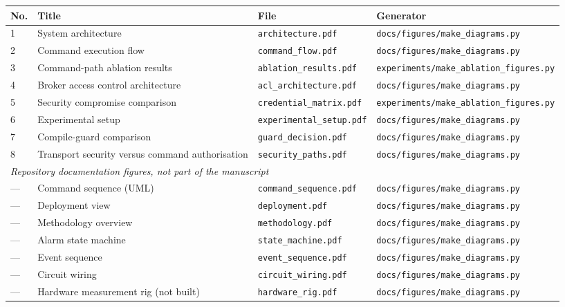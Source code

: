 \begin{longtable}{l p{} p{} p{}}
\toprule
\textbf{No.} & \textbf{Title} & \textbf{File} & \textbf{Generator} \\
\midrule
\endhead
1 & System architecture & \texttt{\footnotesize architecture.pdf} & \texttt{\footnotesize docs/figures/make\_diagrams.py} \\
2 & Command execution flow & \texttt{\footnotesize command\_flow.pdf} & \texttt{\footnotesize docs/figures/make\_diagrams.py} \\
3 & Command-path ablation results & \texttt{\footnotesize ablation\_results.pdf} & \texttt{\footnotesize experiments/make\_ablation\_figures.py} \\
4 & Broker access control architecture & \texttt{\footnotesize acl\_architecture.pdf} & \texttt{\footnotesize docs/figures/make\_diagrams.py} \\
5 & Security compromise comparison & \texttt{\footnotesize credential\_matrix.pdf} & \texttt{\footnotesize experiments/make\_ablation\_figures.py} \\
6 & Experimental setup & \texttt{\footnotesize experimental\_setup.pdf} & \texttt{\footnotesize docs/figures/make\_diagrams.py} \\
7 & Compile-guard comparison & \texttt{\footnotesize guard\_decision.pdf} & \texttt{\footnotesize docs/figures/make\_diagrams.py} \\
8 & Transport security versus command authorisation & \texttt{\footnotesize security\_paths.pdf} & \texttt{\footnotesize docs/figures/make\_diagrams.py} \\
\midrule
\multicolumn{4}{l}{\textit{Repository documentation figures, not part of the manuscript}}\\
\midrule
--- & Command sequence (UML) & \texttt{\footnotesize command\_sequence.pdf} & \texttt{\footnotesize docs/figures/make\_diagrams.py} \\
--- & Deployment view & \texttt{\footnotesize deployment.pdf} & \texttt{\footnotesize docs/figures/make\_diagrams.py} \\
--- & Methodology overview & \texttt{\footnotesize methodology.pdf} & \texttt{\footnotesize docs/figures/make\_diagrams.py} \\
--- & Alarm state machine & \texttt{\footnotesize state\_machine.pdf} & \texttt{\footnotesize docs/figures/make\_diagrams.py} \\
--- & Event sequence & \texttt{\footnotesize event\_sequence.pdf} & \texttt{\footnotesize docs/figures/make\_diagrams.py} \\
--- & Circuit wiring & \texttt{\footnotesize circuit\_wiring.pdf} & \texttt{\footnotesize docs/figures/make\_diagrams.py} \\
--- & Hardware measurement rig (not built) & \texttt{\footnotesize hardware\_rig.pdf} & \texttt{\footnotesize docs/figures/make\_diagrams.py} \\
\bottomrule
\end{longtable}
